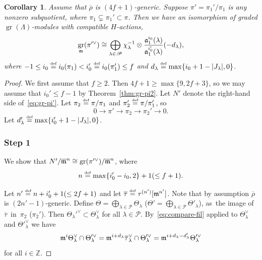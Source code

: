 \documentclass[JEP,XML,SOM,Unicode,NoFloatCountersInSection, NoEqCountersInSection,published]{cedram}
\let\ovl\overline
\newcommand{\defeq}{\stackrel{\textrm{\tiny{\upshape{def}}}}{=}}
\newcommand{\Z}{{\mathbb Z}}
\renewcommand{\P}{\mathscr P}
\newcommand{\fa}{\mathfrak{a}}
\newcommand{\brho}{\overline{\rho}}
\DeclareMathOperator{\gr}{gr}
\theoremstyle{plain}
\newtheorem{cor}[prop]{Corollary}
\theoremstyle{definition}
\begin{document}
\begin{cor}\label{cor:gr-pi'}
Assume that $\brho$ is $(4f+1)$-generic. Suppose $\pi' = \pi_1'/\pi_1$ is any nonzero subquotient, where $\pi_1 \subsetneq \pi_1' \subset \pi$.
Then we have an isomorphism of graded $\gr(\Lambda)$-modules with compatible $H$-actions,
\begin{equation}\label{eq:gr-pi'}
\gr_\m(\pi'^\vee) \cong \bigoplus_{\lambda\in\mathscr{P}}\chi_{\lambda}^{-1}\otimes \frac{\fa_1^{i_0}(\lambda)}{\fa_1^{i_0'}(\lambda)}(-d_\lambda),
\end{equation}
where $-1 \le i_0 \defeq i_0(\pi_1) < i_0'\defeq i_0(\pi_1') \le f$ and $d_\lambda \defeq \max\{i_0+1-|J_\lambda|,0\}$.
\end{cor}

\begin{proof}
We first assume that $f \ge 2$.
Then $4f+1 \ge \max\{9,2f+3\}$, so we may assume that $i_0' \le f-1$ by Theorem~\ref{thm:gr-pi2}.
Let $N'$ denote
the right-hand side of~\eqref{eq:gr-pi'}.
Let $\pi_2 \defeq \pi/\pi_1$ and $\pi'_2 \defeq \pi/\pi'_1$, so
\begin{equation*}
0 \to \pi' \to \pi_2 \to \pi_2' \to 0.
\end{equation*}
Let $d_\lambda' \defeq \max\{i_0'+1-|J_\lambda|,0\}$.

\subsubsection*{Step 1}
We show that $N'/\ovl\m^n \cong \gr(\pi'^\vee)/\ovl\m^n$, where
\[
n \defeq \max\{i_0'-i_0,2\}+1 (\le {f+1}).
\]

Let $n' \defeq n+i_0'+1 {(\le {2f+1})}$ and let $\ovl\tau \defeq \tau^{(n')}[\m^{n'}]$.
{Note that by assumption $\brho$ is $(2n'-1)$-generic.}
Define $\Theta \!=\! \bigoplus_{\lambda \in \P} \Theta_\lambda$ (\resp $\Theta' \!=\! \bigoplus_{\lambda \in \P} \Theta'_\lambda$), as~the image of~$\ovl\tau$~in~$\pi_2$ (\resp $\pi_2'$).
Then $\Theta_\lambda'^\vee \subset \Theta^\vee_\lambda$ for all $\lambda \in \P$.
By~\eqref{eq:compare-fil} applied to $\Theta^\vee_\lambda $ and $\Theta'^\vee_\lambda$ we have
\begin{equation}\label{eq:compare-fil2}
\m^i \Theta_\lambda^\vee \cap \Theta'^\vee_\lambda = \m^{i+d_\lambda}\ovl\tau_\lambda^\vee \cap \Theta'^\vee_\lambda = \m^{i+d_\lambda-d_\lambda'}\Theta'^\vee_\lambda
\end{equation}
for all $i \in \Z$.


\end{proof}
\end{document}
